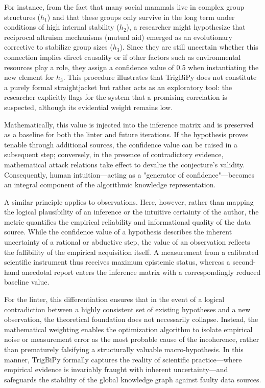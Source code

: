 \documentclass[11pt, a4paper]{article}
\begin{document}
	For instance, from the fact that many social mammals live in complex group structures ($h_1$) and that these groups only survive in the long term under conditions of high internal stability ($h_2$), a researcher might hypothesize that reciprocal altruism mechanisms (mutual aid) emerged as an evolutionary corrective to stabilize group sizes ($h_3$). Since they are still uncertain whether this connection implies direct causality or if other factors such as environmental resources play a role, they assign a confidence value of 0.5 when instantiating the new element for $h_3$. This procedure illustrates that TrigBiPy does not constitute a purely formal straightjacket but rather acts as an exploratory tool: the researcher explicitly flags for the system that a promising correlation is suspected, although its evidential weight remains low. 
	
	Mathematically, this value is injected into the inference matrix and is preserved as a baseline for both the linter and future iterations. If the hypothesis proves tenable through additional sources, the confidence value can be raised in a subsequent step; conversely, in the presence of contradictory evidence, mathematical attack relations take effect to devalue the conjecture's validity. Consequently, human intuition—acting as a "generator of confidence"—becomes an integral component of the algorithmic knowledge representation. 
	
	A similar principle applies to observations. Here, however, rather than mapping the logical plausibility of an inference or the intuitive certainty of the author, the metric quantifies the empirical reliability and informational quality of the data source. While the confidence value of a hypothesis describes the inherent uncertainty of a rational or abductive step, the value of an observation reflects the fallibility of the empirical acquisition itself. A measurement from a calibrated scientific instrument thus receives maximum epistemic status, whereas a second-hand anecdotal report enters the inference matrix with a correspondingly reduced baseline value. 
	
	For the linter, this differentiation ensures that in the event of a logical contradiction between a highly consistent set of existing hypotheses and a new observation, the theoretical foundation does not necessarily collapse. Instead, the mathematical weighting enables the optimization algorithm to isolate empirical noise or measurement error as the most probable cause of the incoherence, rather than prematurely falsifying a structurally valuable macro-hypothesis. In this manner, TrigBiPy formally captures the reality of scientific practice—where empirical evidence is invariably fraught with inherent uncertainty—and safeguards the stability of the global knowledge graph against faulty data sources.
	
\end{document}
